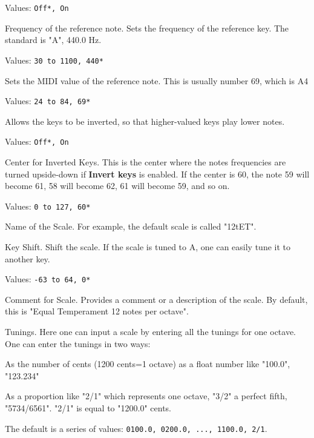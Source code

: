    Values: \texttt{Off*, On}

   Frequency of the reference note.
   Sets the frequency of the reference key. The standard is "A", 440.0 Hz.

   Values: \texttt{30 to 1100, 440*}

   Sets the MIDI value of the reference note. This is usually number 69,
   which is A4

   Values: \texttt{24 to 84, 69*}

   Allows the keys to be inverted, so that higher-valued keys play lower
   notes.

   Values: \texttt{Off*, On}

   Center for Inverted Keys.
   This is the center where the notes frequencies are turned upside-down if
   \textbf{Invert keys} is enabled.
   If the center is 60, the note 59 will become 61, 58 will become 62, 61
   will become 59, and so on.

   Values: \texttt{0 to 127, 60*}

   Name of the Scale.
   For example, the default scale is called "12tET".

   Key Shift.
   Shift the scale. If the scale is tuned to A, one can easily tune it to
   another key.

   Values: \texttt{-63 to 64, 0*}

   Comment for Scale.
   Provides a comment or a description of the scale.
   By default, this is "Equal Temperament 12 notes per octave".

   Tunings.
   Here one can input a scale by entering all the tunings for one octave.
One can enter the tunings in two ways:

   \begin{enumber}
      \item As the number of cents (1200 cents=1 octave) as a float number
         like "100.0", "123.234"
      \item As a proportion like "2/1" which represents one octave, "3/2" a
         perfect fifth, "5734/6561".  "2/1" is equal to "1200.0" cents.
   \end{enumber}

   The default is a series of values:
   \texttt{0100.0, 0200.0, ..., 1100.0, 2/1}.


